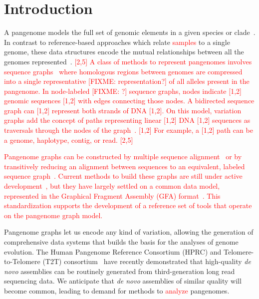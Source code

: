 \documentclass{bioinfo}
\newcommand{\red}[1]{{\textcolor{Red}{#1}}}
\newcommand{\FIXME}[1]{\red{[FIXME: #1]}}
\newcommand{\REVIEWED}[1]{{\textcolor{Red}{#1}}}
\begin{document}
\section{Introduction}
A pangenome models the full set of genomic elements in a given species or clade~\REVIEWED{\citep{cpang2018,Eizenga_2020}}.
In contrast to reference-based approaches which relate \REVIEWED{samples} to a single genome, these data structures encode the mutual relationships between all the genomes represented\REVIEWED{~\citep{Ballouz2019}}.
\REVIEWED{[2,5] A class of methods to represent pangenomes involves sequence graphs~\citep{Hein1989, Paten:2017} where homologous regions between genomes are compressed into a single representative \FIXME{representation?} of all alleles present in the pangenome.
In node-labeled \FIXME{?} sequence graphs, nodes indicate \REVIEWED{[1,2] genomic sequences [1,2]} with edges connecting those nodes.
A bidirected sequence graph can \REVIEWED{[1,2] represent both strands of DNA [1,2]}.
On this model, variation graphs add the concept of paths representing linear \REVIEWED{[1,2] DNA [1,2]} sequences as traversals through the nodes of the graph~\citep{Garrison:2018}. \REVIEWED{[1,2] For example, a [1,2]} path can be a genome, haplotype, contig, or read. [2,5]}

\REVIEWED{Pangenome graphs can be constructed by multiple sequence alignment~\citep{Lee_2002,Grasso_2004} or by transitively reducing an alignment between sequences to an equivalent, labeled sequence graph~\citep{Kehr_2014,Garrison_2019_thesis}.
Current methods to build these graphs are still under active development~\citep{Li:2020,Armstrong:2020,pggb}, but they have largely settled on a common data model, represented in the Graphical Fragment Assembly (GFA) format~\citep{GFA}.
This standardization supports the development of a reference set of tools that operate on the pangenome graph model.}

Pangenome graphs let us encode any kind of variation, allowing the generation of comprehensive data systems that builds the basis for the analyses of genome evolution.
The Human Pangenome Reference Consortium (HPRC) and Telomere-to-Telomere (T2T) consortium~\citep{Miga:2020, Logsdon_2021, Nurk_2021} have recently demonstrated that high-quality \textit{de novo} assemblies can be routinely generated from third-generation long read sequencing data.
We anticipate that \textit{de novo} assemblies of similar quality will become common, leading to demand for methods to \REVIEWED{analyze} pangenomes.
\end{document}

